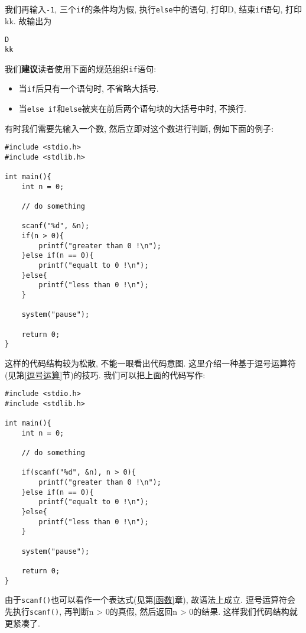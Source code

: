             我们再输入\texttt{-1}, 三个\texttt{if}的条件均为假, 执行\texttt{else}中的语句, 打印D, 结束\texttt{if}语句, 打印kk. 故输出为
\begin{lstlisting}
D
kk
\end{lstlisting}

            我们\textbf{建议}读者使用下面的规范组织\texttt{if}语句:
            \begin{itemize}
                \item 当\texttt{if}后只有一个语句时, 不省略大括号.
                \item 当\texttt{else if}和\texttt{else}被夹在前后两个语句块的大括号中时, 不换行.
            \end{itemize}

            \begin{mdframed}[linecolor=darkgray]
            有时我们需要先输入一个数, 然后立即对这个数进行判断, 例如下面的例子:
\begin{lstlisting}
#include <stdio.h>
#include <stdlib.h>

int main(){
    int n = 0;

    // do something

    scanf("%d", &n);
    if(n > 0){
        printf("greater than 0 !\n");
    }else if(n == 0){
        printf("equalt to 0 !\n");
    }else{
        printf("less than 0 !\n");
    }

    system("pause");

    return 0;
}
\end{lstlisting}

            这样的代码结构较为松散, 不能一眼看出代码意图. 这里介绍一种基于逗号运算符(见第\ref{逗号运算}节)的技巧. 我们可以把上面的代码写作:
\begin{lstlisting}
#include <stdio.h>
#include <stdlib.h>

int main(){
    int n = 0;

    // do something

    if(scanf("%d", &n), n > 0){
        printf("greater than 0 !\n");
    }else if(n == 0){
        printf("equalt to 0 !\n");
    }else{
        printf("less than 0 !\n");
    }

    system("pause");

    return 0;
}
\end{lstlisting}

            由于\texttt{scanf()}也可以看作一个表达式(见第\ref{函数}章), 故语法上成立. 逗号运算符会先执行\texttt{scanf()}, 再判断n > 0的真假, 然后返回n > 0的结果. 这样我们代码结构就更紧凑了.
            \end{mdframed}


